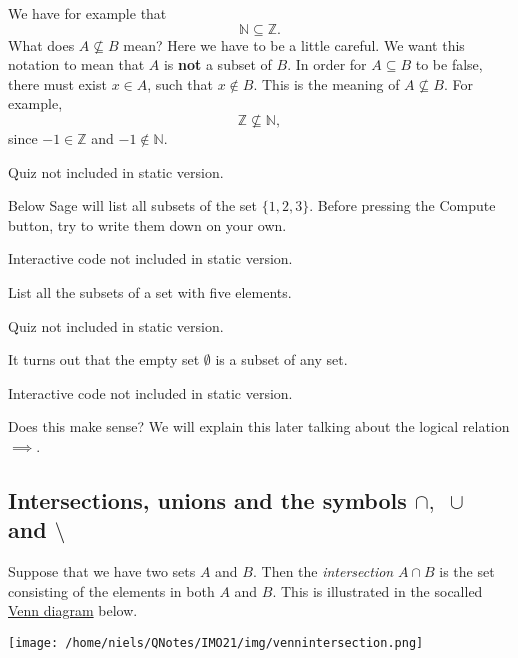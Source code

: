 We have
for example that
$$
  \mathbb{N} \subseteq \mathbb{Z}.
$$
What does $A\not\subseteq B$ mean? Here we have to be a little
careful. We want this notation to mean that $A$ is \textbf{not} a
subset of $B$. In order for $A\subseteq B$ to be
false, there must exist $x\in A$, such that $x\notin B$. This
is the meaning of $A\not\subseteq B$. For example,
$$
  \mathbb{Z}\not\subseteq \mathbb{N},
$$
since $-1\in \mathbb{Z}$ and $-1\notin \mathbb{N}$.

\begin{quizexercise} Quiz not included in static version.\end{quizexercise}

Below Sage will list all subsets of the set $\{1, 2, 3\}$. Before pressing
the Compute button, try to write them down on your own.

\begin{sage} Interactive code not included in static version.\end{sage}

\begin{exercise}
  List all the subsets of a set with five elements.
\end{exercise}

\begin{quizexercise} Quiz not included in static version.\end{quizexercise}

It turns out that the empty set $\emptyset$ is a subset of any set.

\begin{sage} Interactive code not included in static version.\end{sage}

Does this
make sense? We will explain this later talking about the logical relation $\implies$.

\subsection{Intersections, unions and the symbols $\cap,\,\, \cup$ and $\setminus$}

Suppose that we have two sets $A$ and $B$. Then the \emph{intersection} $A\cap B$ is the
set consisting of the elements in both $A$ and $B$. This is illustrated in the
socalled \href{https://en.wikipedia.org/wiki/Venn\_diagram}{Venn diagram} below.

\begin{center}\texttt{[image: /home/niels/QNotes/IMO21/img/vennintersection.png]}\end{center}

